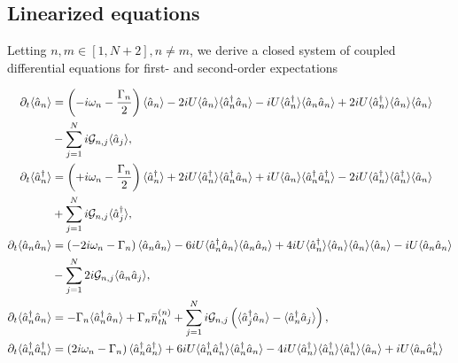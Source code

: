 \subsection{Linearized equations}
Letting $n, m \in \left[1, N+2\right], n \ne m$, we derive a closed system of coupled differential equations for first- and second-order expectations

\begingroup
\allowdisplaybreaks
\begin{align}\label{eqn:linearsystem}
\partial_t\langle\hat{a}_n\rangle &= \left(- i \omega_n - \frac{\Gamma_n}{2}\right)\langle\hat{a}_n\rangle - 2 i U \langle\hat{a}_n\rangle\langle\hat{a}_n^\dagger\hat{a}_n\rangle - i U \langle\hat{a}_n^\dagger\rangle\langle\hat{a}_n\hat{a}_n\rangle + 2 i U \langle\hat{a}_n^\dagger\rangle \langle\hat{a}_n\rangle\langle\hat{a}_n\rangle \notag \\
&- \sum_{j=1}^N i \mathcal{G}_{n, j} \langle\hat{a}_j\rangle, \notag \\
%
%
\partial_t\langle\hat{a}_n^\dagger\rangle &= \left(+ i \omega_n - \frac{\Gamma_n}{2} \right) \langle\hat{a}_n^\dagger\rangle + 2 i U \langle\hat{a}_n^\dagger\rangle\langle\hat{a}_n^\dagger\hat{a}_n\rangle + i U \langle\hat{a}_n\rangle\langle\hat{a}_n^\dagger\hat{a}_n^\dagger\rangle - 2 i U\langle\hat{a}_n^\dagger\rangle\langle\hat{a}_n^\dagger\rangle\langle\hat{a}_n\rangle \notag \\
&+ \sum_{j=1}^N i \mathcal{G}_{n,j}\langle\hat{a}_j^\dagger\rangle, \notag \\
%
%
\partial_t\langle\hat{a}_n\hat{a}_n\rangle &= \left( - 2 i \omega_n - \Gamma_n\right) \langle\hat{a}_n\hat{a}_n\rangle - 6 i U \langle\hat{a}_n^\dagger \hat{a}_n\rangle \langle\hat{a}_n\hat{a}_n\rangle + 4 i U \langle\hat{a}_n^\dagger\rangle \langle\hat{a}_n\rangle \langle\hat{a}_n\rangle\langle\hat{a}_n\rangle - i U \langle \hat{a}_n\hat{a}_n\rangle \notag \\
&- \sum_{j=1}^N 2 i \mathcal{G}_{n, j}\langle\hat{a}_n\hat{a}_j\rangle,  \notag \\
%
%
\partial_t \langle\hat{a}_n^\dagger\hat{a}_n\rangle &= - \Gamma_n\langle\hat{a}_n^\dagger\hat{a}_n\rangle + \Gamma_n \bar{n}_{th}^{\left(n\right)} + \sum_{j=1}^N i \mathcal{G}_{n, j}\left(\langle\hat{a}_j^\dagger\hat{a}_n\rangle - \langle\hat{a}_n^\dagger\hat{a}_j\rangle\right), \notag \\ 
%
%
%
%
\partial_t\langle\hat{a}_n^\dagger\hat{a}_n^\dagger\rangle &= \left(2 i \omega_n - \Gamma_n  \right) \langle\hat{a}_n^\dagger\hat{a}_n^\dagger\rangle + 6 i U \langle\hat{a}_n^\dagger\hat{a}_n^\dagger\rangle\langle\hat{a}_n^\dagger \hat{a}_n\rangle - 4 i U \langle\hat{a}_n^\dagger\rangle\langle\hat{a}_n^\dagger\rangle\langle\hat{a}_n^\dagger\rangle\langle\hat{a}_n\rangle + i U \langle\hat{a}_n\hat{a}^\dagger_n\rangle  \notag \\

\end{align}
